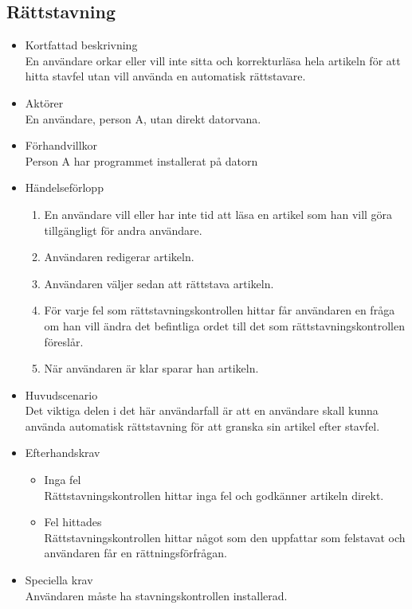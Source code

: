\subsection{Rättstavning}
\begin{itemize}
	\item Kortfattad beskrivning
	\\En användare orkar eller vill inte sitta och korrekturläsa hela artikeln för att hitta stavfel utan vill använda en automatisk rättstavare.
	\item Aktörer
	\\En användare, person A, utan direkt datorvana.
	\item Förhandvillkor
	\\Person A har programmet installerat på datorn
	\item Händelseförlopp
	\begin{enumerate}
		\item En användare vill eller har inte tid att läsa en artikel som han vill göra tillgängligt för andra användare.
		\item Användaren redigerar artikeln.
		\item Användaren väljer sedan att rättstava artikeln.
		\item För varje fel som rättstavningskontrollen hittar får användaren en fråga om han vill ändra det befintliga ordet till det som rättstavningskontrollen föreslår.
		\item När användaren är klar sparar han artikeln.
	\end{enumerate}
	\item Huvudscenario
	\\Det viktiga delen i det här användarfall är att en användare skall kunna använda automatisk rättstavning för att granska sin artikel efter stavfel.
	\item Efterhandskrav
	\begin{itemize}
	\item Inga fel
	\\Rättstavningskontrollen hittar inga fel och godkänner artikeln direkt.
	\item Fel hittades
	\\Rättstavningskontrollen hittar något som den uppfattar som felstavat och användaren får en rättningsförfrågan.
	\end{itemize}	
	\item Speciella krav
	\\Användaren måste ha stavningskontrollen installerad.
\end{itemize}

